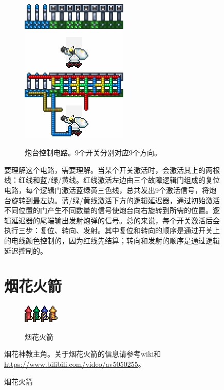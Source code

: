 \begin{figure}[!ht]
\begin{figure}[!ht]
\centering
\includegraphics{images/398.png}
\qquad
\includegraphics{images/399.png}
\caption{炮台控制电路。9个开关分别对应9个方向。}\label{fig34}
\end{figure}

要理解这个电路，需要理解。当某个开关激活时，会激活其上的两根线：红线和蓝/绿/黄线。红线激活左边由三个故障逻辑门组成的复位电路，每个逻辑门激活蓝绿黄三色线，总共发出9个激活信号，将炮台旋转到最左边。蓝/绿/黄线激活下方的逻辑延迟器，通过初始激活不同位置的门产生不同数量的信号使炮台向右旋转到所需的位置。逻辑延迟器的尾端输出发射炮弹的信号。总的来说，每个开关激活后会执行三步：复位、转向、发射。其中复位和转向的顺序是通过开关上的电线颜色控制的，因为红线先结算；转向和发射的顺序是通过逻辑延迟控制的。

\section{烟花火箭}
\begin{figure}[!ht]
\centering
\includegraphics{figures/Red_Rocket.png}\quad\includegraphics{figures/Green_Rocket.png}\quad\includegraphics{figures/Blue_Rocket.png}\quad\includegraphics{figures/Yellow_Rocket.png}
\caption{烟花火箭}
\end{figure}
烟花神教主角。关于烟花火箭的信息请参考wiki和\url{https://www.bilibili.com/video/av5050255}。


\end{figure}
